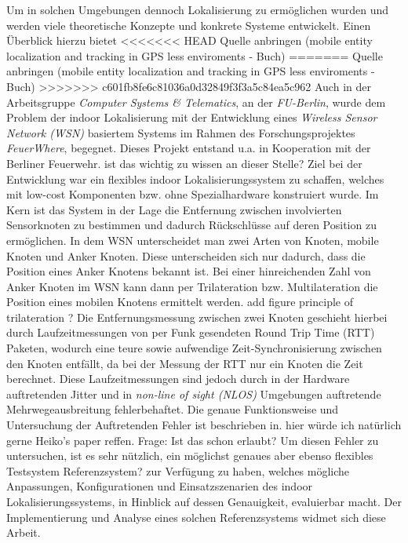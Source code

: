 Um in solchen Umgebungen dennoch Lokalisierung zu ermöglichen wurden und werden viele theoretische Konzepte und 
konkrete Systeme entwickelt. Einen Überblick hierzu bietet
<<<<<<< HEAD
{\color{red}Quelle anbringen (mobile entity localization and tracking in GPS less enviroments - Buch)}
=======
Quelle anbringen (mobile entity localization and tracking in GPS less enviroments - Buch)
>>>>>>> c601fb8fe6c81036a0d32849f3f3a5c84ea5c962
Auch in der Arbeitsgruppe \textit{Computer Systems \& Telematics}, an der \textit{FU-Berlin}, 
wurde dem Problem der indoor Lokalisierung mit der Entwicklung eines \textit{Wireless Sensor Network (WSN)}
basiertem Systems im Rahmen des Forschungsprojektes \textit{FeuerWhere}, begegnet. 
Dieses Projekt entstand u.a. in Kooperation mit der Berliner Feuerwehr.
{\color{red}ist das wichtig zu wissen an dieser Stelle?}
Ziel bei der Entwicklung war ein flexibles indoor Lokalisierungssystem zu schaffen, welches mit
low-cost Komponenten bzw. ohne Spezialhardware konstruiert wurde. 
Im Kern ist das System in der Lage die Entfernung zwischen involvierten Sensorknoten zu bestimmen und 
dadurch Rückschlüsse auf deren Position zu ermöglichen. 
In dem WSN unterscheidet man zwei Arten von Knoten, mobile Knoten und Anker Knoten. 
Diese unterscheiden sich nur dadurch, dass die Position eines Anker Knotens bekannt ist.
Bei einer hinreichenden Zahl von Anker Knoten im WSN kann dann per Trilateration bzw. Multilateration 
die Position eines mobilen Knotens ermittelt werden.
{\color{red} add figure principle of trilateration ?}
Die Entfernungsmessung zwischen zwei Knoten geschieht hierbei durch Laufzeitmessungen von per Funk gesendeten
Round Trip Time (RTT) Paketen, wodurch eine teure sowie aufwendige Zeit-Synchronisierung zwischen den Knoten entfällt,
da bei der Messung der RTT nur ein Knoten die Zeit berechnet.
Diese Laufzeitmessungen sind jedoch durch in der Hardware auftretenden Jitter und 
in \textit{non-line of sight (NLOS)} Umgebungen auftretende Mehrwegeausbreitung fehlerbehaftet. 
Die genaue Funktionsweise und Untersuchung der Auftretenden Fehler ist beschrieben in.
{\color{red} hier würde ich natürlich gerne Heiko's paper reffen. Frage: Ist das schon erlaubt?}
Um diesen Fehler zu untersuchen, ist es sehr nützlich, ein möglichst genaues aber ebenso flexibles Testsystem
{\color{red}Referenzsystem?} zur Verfügung zu haben, welches mögliche Anpassungen, Konfigurationen und 
Einsatzszenarien des indoor Lokalisierungssystems, in Hinblick auf dessen Genauigkeit, evaluierbar macht.
Der Implementierung und Analyse eines solchen Referenzsystems widmet sich diese Arbeit. 


